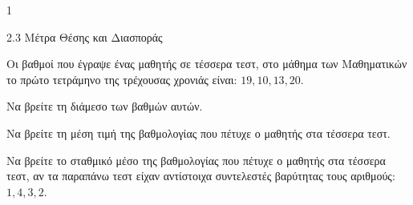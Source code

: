 \begin{ylh}{1}
    \item 2.3 Μέτρα Θέσης και Διασποράς
\end{ylh}
Οι βαθμοί που έγραψε ένας μαθητής σε τέσσερα τεστ, στο μάθημα των Μαθηματικών το πρώτο τετράμηνο της τρέχουσας χρονιάς είναι: $19, 10, 13, 20$.
\begin{alist}
\item Να βρείτε τη διάμεσο των βαθμών αυτών. 
\item Να βρείτε τη μέση τιμή της βαθμολογίας που πέτυχε ο μαθητής στα τέσσερα τεστ. 
\item Να βρείτε το σταθμικό μέσο της βαθμολογίας που πέτυχε ο μαθητής στα τέσσερα τεστ, αν τα παραπάνω τεστ είχαν αντίστοιχα συντελεστές βαρύτητας τους αριθμούς: $1, 4, 3, 2$. 
\end{alist}

